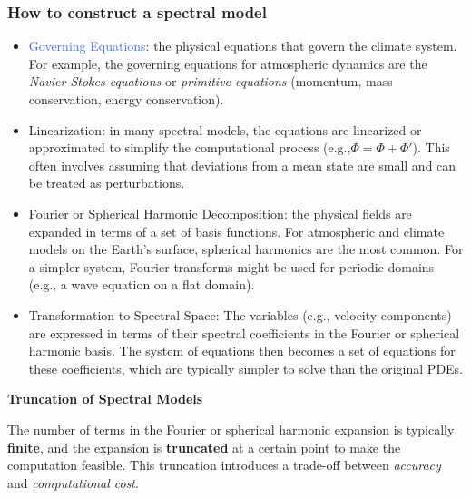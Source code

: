 \subsubsection{How to construct a spectral model}
\begin{itemize}
	\item \textcolor{RoyalBlue}{Governing Equations}: the physical equations that govern the climate system. For example, the governing equations for atmospheric dynamics are the \textit{Navier-Stokes equations} or \textit{primitive equations} (momentum, mass conservation, energy conservation).
	\item \textcolor{Sepia}{Linearization}: in many spectral models, the equations are linearized or approximated to simplify the computational process (e.g.,$\Phi=\overline{\Phi}+\Phi'$). This often involves assuming that deviations from a mean state are small and can be treated as perturbations.
	\item \textcolor{RoyalPurple}{Fourier or Spherical Harmonic Decomposition}: the physical fields are expanded in terms of a set of basis functions. For atmospheric and climate models on the Earth's surface, spherical harmonics are the most common. For a simpler system, Fourier transforms might be used for periodic domains (e.g., a wave equation on a flat domain).

	\item \textcolor{OliveGreen}{Transformation to Spectral Space}: The variables (e.g., velocity components) are expressed in terms of their spectral coefficients in the Fourier or spherical harmonic basis. The system of equations then becomes a set of equations for these coefficients, which are typically simpler to solve than the original PDEs.
\end{itemize}

\textbf{Truncation of Spectral Models}

The number of terms in the Fourier or spherical harmonic expansion is typically \textbf{finite}, and the expansion is \textbf{truncated} at a certain point to make the computation feasible. This truncation introduces a trade-off between \textit{accuracy} and \textit{computational cost}.


